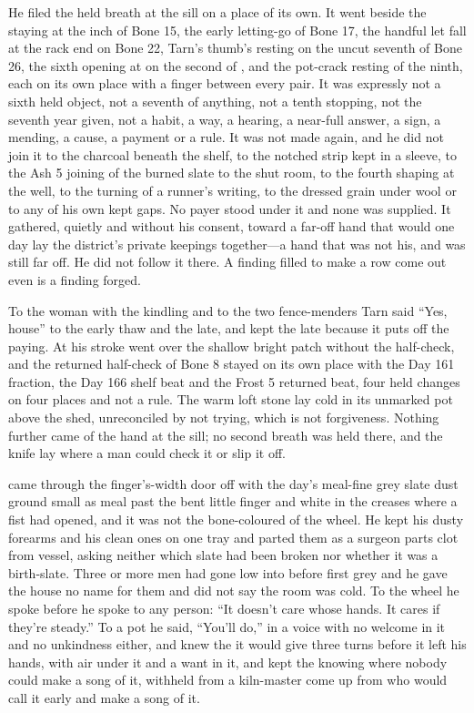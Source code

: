 He filed the held breath at the sill on a place of its own. It went beside the staying at the inch of Bone 15, the early letting-go of Bone 17, the handful let fall at the rack end on Bone 22, Tarn's thumb's resting on the uncut seventh of Bone 26, the sixth opening at  on the second of , and the pot-crack resting of the ninth, each on its own place with a finger between every pair. It was expressly not a sixth held object, not a seventh of anything, not a tenth stopping, not the seventh year given, not a habit, a way, a hearing, a near-full answer, a sign, a mending, a cause, a payment or a rule. It was not made again, and he did not join it to the charcoal beneath the shelf, to the notched strip kept in a sleeve, to the Ash 5 joining of the burned slate to the shut room, to the fourth shaping at the well, to the turning of a runner's writing, to the dressed grain under wool or to any of his own kept gaps. No payer stood under it and none was supplied. It gathered, quietly and without his consent, toward a far-off hand that would one day lay the district's private keepings together---a hand that was not his, and was still far off. He did not follow it there. A finding filled to make a row come out even is a finding forged.

To the woman with the kindling and to the two fence-menders Tarn said “Yes, house” to the early thaw and the late, and kept the late because it puts off the paying. At  his stroke went over the shallow bright patch without the half-check, and the returned half-check of Bone 8 stayed on its own place with the Day 161 fraction, the Day 166 shelf beat and the Frost 5 returned beat, four held changes on four places and not a rule. The warm loft stone lay cold in its unmarked pot above the shed, unreconciled by not trying, which is not forgiveness. Nothing further came of the hand at the sill; no second breath was held there, and the knife lay where a man could check it or slip it off.

 came through the finger's-width door off  with the day's meal-fine grey slate dust ground small as meal past the bent little finger and white in the creases where a fist had opened, and it was not the bone-coloured  of the wheel. He kept his dusty forearms and his clean ones on one tray and parted them as a surgeon parts clot from vessel, asking neither which slate had been broken nor whether it was a birth-slate. Three or more men had gone low into  before first grey and he gave the house no name for them and did not say the room was cold. To the wheel he spoke before he spoke to any person: “It doesn't care whose hands. It cares if they're steady.” To a pot he said, “You'll do,” in a voice with no welcome in it and no unkindness either, and knew the  it would give three turns before it left his hands, with air under it and a want in it, and kept the knowing where nobody could make a song of it, withheld from a kiln-master come up from  who would call it early and make a song of it.

